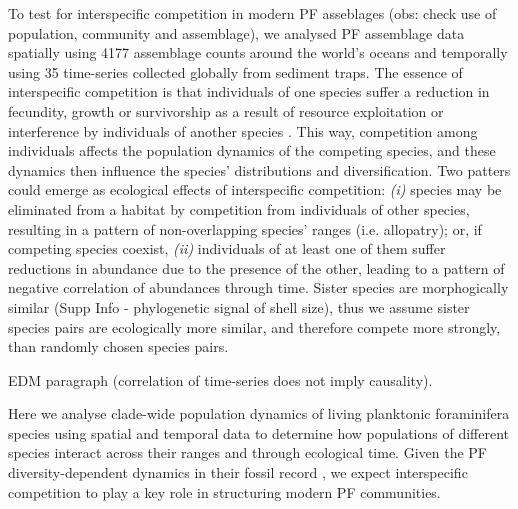 
To test for interspecific competition in modern PF asseblages (obs: check use of population, community and assemblage), we analysed PF assemblage data spatially using 4177 assemblage counts around the world's oceans and temporally using 35 time-series collected globally from sediment traps. 
The essence of interspecific competition is that individuals of one species suffer a reduction in fecundity, growth or survivorship as a result of resource exploitation or interference by individuals of another species \citep{begon2006ecology}. This way, competition among individuals affects the population dynamics of the competing species, and these dynamics then influence the species' distributions and diversification. 
Two patters could emerge as ecological effects of interspecific competition: \textit{(i)} species may be eliminated from a habitat by competition from individuals of other species, resulting in a pattern of non-overlapping species’ ranges (i.e. allopatry); or, if competing species coexist, \textit{(ii)} individuals of at least one of them suffer reductions in abundance due to the presence of the other, leading to a pattern of negative correlation of abundances through time.
Sister species are morphogically similar (Supp Info - phylogenetic signal of shell size), thus we assume sister species pairs are ecologically more similar, and therefore compete more strongly, than randomly chosen species pairs. 


EDM paragraph (correlation of time-series does not imply causality).



Here we analyse clade-wide population dynamics of living planktonic foraminifera species using spatial and temporal data to determine how populations of different species interact across their ranges and through ecological time. Given the PF diversity-dependent dynamics in their fossil record \citep{ezard2011interplay, ezard2016ecolet}, we expect interspecific competition to play a key role in structuring modern PF communities. 




